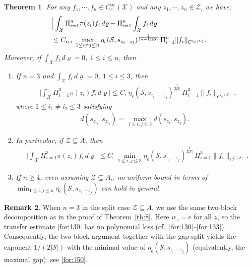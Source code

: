 \documentclass[11 pt]{amsart}
\newcommand{\norm}[1]{\lVert#1\rVert}
\newtheorem{theorem}{Theorem}[section]
\theoremstyle{definition}
\newtheorem{remark}[theorem]{Remark}
\numberwithin{equation}{section}
\begin{document}
\begin{theorem}\label{th:3} For any $f_1,\cdots, f_n\in C_c^{\infty}(\mathcal{X})$ and any $z_1,\cdots,z_n\in\mathcal{Z}$, we have:
 \begin{align}\label{for:219}
 &\Big|\int_{\mathcal{X}} \Pi_{i=1}^{n} \pi(z_i)f_i \,d\varrho - \Pi_{i=1}^{n} \int_{\mathcal{X}} f_i \,d\varrho\Big|\notag\\
 &\leq C_{n,\epsilon}\,\max_{1\le i\neq j\le n}\eta_\epsilon (\mathcal{S}, s_{z_i-z_j})^{\frac{1}{(n-1)|\mathcal{S}|}}\,
\Pi_{i=1}^n\norm{f_i}_{C^{\zeta_{\epsilon}(\mathcal{S})}}.
\end{align}
Moreover, if   $\int_{\mathcal{X}} f_i \, d\varrho=0$, $1\leq i\leq n$, then
\begin{enumerate}
  \item\label{for:247} If $n=3$ and $\int_{\mathcal{X}} f_i \,d\varrho=0$, $1\leq i\leq3$,  then
\begin{align*}
 &\Big|\int_{\mathcal{X}} \Pi_{i=1}^{3} \pi(z_i)f_i \,d\varrho \Big|\le C_{\epsilon}\,\eta_\epsilon (\mathcal{S}, s_{z_{i_1}-z_{i_2}})^{\frac{1}{2|\mathcal{S}|}}\,
\Pi_{i=1}^3\norm{f_i}_{C^{\zeta_{\epsilon}(\mathcal{S})}}.
\end{align*}
where $1\leq i_1\neq i_2\leq 3$ satisfying
\begin{align*}
   d(s_{z_{i_1}},s_{z_{i_2}})=\max_{1\leq i,j\leq3}d(s_{z_{i}},s_{z_{j}}).
  \end{align*}
  \item\label{for:150} In particular, if $\mathcal Z\subseteq A$, then
\begin{align*}
 &\Big|\int_{\mathcal{X}} \Pi_{i=1}^{3} \pi(z_i)f_i \,d\varrho \Big|\le C_{\epsilon}\,\min_{1\le i,j\le 3}\eta_\epsilon (\mathcal{S}, s_{z_{i}-z_{j}})^{\frac{1}{2|\mathcal{S}|}}\,
\Pi_{i=1}^3\norm{f_i}_{C^{\zeta_{\epsilon}(\mathcal{S})}}.
\end{align*}
  \item\label{for:191} If $n\geq 4$, even assuming $\mathcal Z\subseteq A$,,  no uniform bound in terms of $\min_{1\le i,j\le n} \eta_\epsilon(\mathcal{S}, s_{z_i-z_j})$ can hold in general.
\end{enumerate}









\end{theorem}
\begin{remark}  When $n=3$ in the split case $\mathcal Z\subseteq A$, we use the same two-block decomposition as in the proof of Theorem~\ref{th:8}. Here $w_z=e$ for all $z$, so the transfer estimate \eqref{for:130} has no polynomial loss (cf.\ \eqref{for:130}–\eqref{for:133}). Consequently, the two-block argument together with the gap split yields the exponent $1/(2|\mathcal S|)$ with the minimal value of $\eta_\epsilon(\mathcal S,s_{z_i-z_j})$ (equivalently, the maximal gap); see \eqref{for:150}.
\end{remark}
\end{document}
